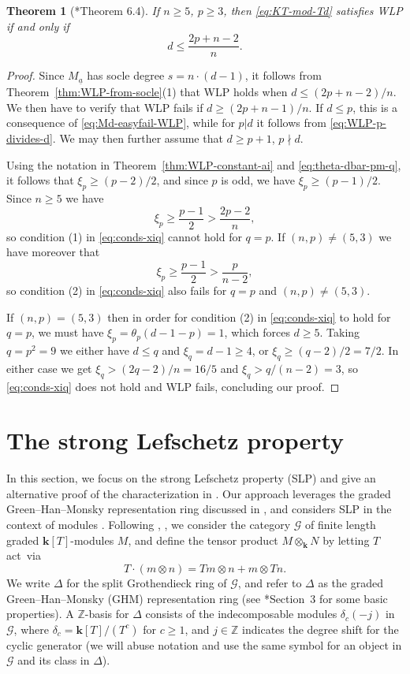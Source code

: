 \documentclass[11pt,reqno]{amsart}
\newcommand{\defi}[1]{{\upshape\sffamily #1}}
\def\kk{{\mathbf k}}
\newcommand{\oo}{\otimes}
\newcommand{\bb}[1]{\mathbb{#1}}
\newcommand{\mc}[1]{\mathcal{#1}}
\newcommand{\ul}[1]{\underline{#1}}
\newtheorem{theorem}{Theorem}[section]
\theoremstyle{definition}
\theoremstyle{remark}
\numberwithin{equation}{section}
\begin{document}
\begin{theorem}[\cite{kus-vra}*{Theorem 6.4}]
    If $n\geq 5$, $p \geq 3$, then \eqref{eq:KT-mod-Td} satisfies WLP if and only if
    \[ d \leq \frac{2p+n-2}{n}.\]
\end{theorem}

\begin{proof}
    Since $M_{\ul{a}}$ has socle degree $s=n\cdot(d-1)$, it follows from Theorem~\ref{thm:WLP-from-socle}(1) that WLP holds when $d\leq(2p+n-2)/n$. We then have to verify that WLP fails if $d\geq(2p+n-1)/n$. If $d\leq p$, this is a consequence of \eqref{eq:Md-easyfail-WLP}, while for $p|d$ it follows from \eqref{eq:WLP-p-divides-d}. We may then further assume that $d\geq p+1$, $p\nmid d$.

    Using the notation in Theorem~\ref{thm:WLP-constant-ai} and \eqref{eq:theta-dbar-pm-q}, it follows that $\xi_p\geq(p-2)/2$, and since $p$ is odd, we have $\xi_p\geq(p-1)/2$. Since $n\geq 5$ we have
    \[\xi_p\geq\frac{p-1}{2}>\frac{2p-2}{n},\]
    so condition (1) in \eqref{eq:conds-xiq} cannot hold for $q=p$. If $(n,p)\neq(5,3)$ we have moreover that
    \[\xi_p\geq\frac{p-1}{2} > \frac{p}{n-2},\]
    so condition (2) in \eqref{eq:conds-xiq} also fails for $q=p$ and $(n,p)\neq (5,3)$. 
    
    If $(n,p)=(5,3)$ then in order for condition (2) in \eqref{eq:conds-xiq} to hold for $q=p$, we must have $\xi_p = \theta_p(d-1-p)=1$, which forces $d\geq 5$. Taking $q=p^2=9$ we either have $d\leq q$ and $\xi_q = d-1\geq 4$, or $\xi_q\geq(q-2)/2 = 7/2$. In either case we get $\xi_q > (2q-2)/n=16/5$ and $\xi_q>q/(n-2)=3$, so \eqref{eq:conds-xiq} does not hold and WLP fails, concluding our proof.
\end{proof}



\section{The strong Lefschetz property}
\label{sec:SLP}

In this section, we focus on the strong Lefschetz property (SLP) and give an alternative proof of the characterization in \cites{nick,lund-nick}. Our approach leverages the graded Green--Han--Monsky representation ring discussed in \cite{KMRR}, and considers SLP in the context of modules \cite{harima-watanabe}. Following \cite{green}, \cite{han-monsky}, we consider the category $\mc{G}$ of finite length graded $\kk[T]$-modules $M$, and define the tensor product $M\oo_{\kk} N$ by letting $T$ act~via
\[ T \cdot (m\oo n) = Tm\oo n + m\oo Tn.\]
We write $\Delta$ for the split Grothendieck ring of $\mc{G}$, and refer to $\Delta$ as the \defi{graded Green--Han--Monsky (GHM) representation ring} (see \cite{KMRR}*{Section~3} for some basic properties). A $\bb{Z}$-basis for $\Delta$ consists of the indecomposable modules $\delta_c(-j)$ in $\mc{G}$, where $\delta_c=\kk[T]/(T^c)$ for $c\geq 1$, and $j\in\bb{Z}$ indicates the degree shift for the cyclic generator  (we will abuse notation and use the same symbol for an object in $\mc{G}$ and its class in $\Delta$).
\end{document}
